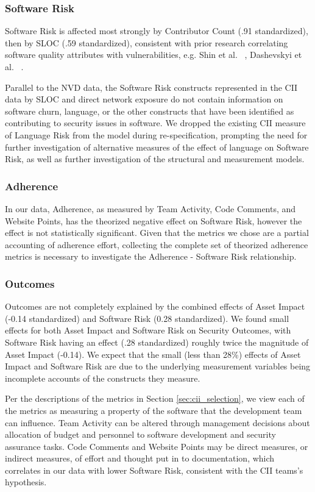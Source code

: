 \subsubsection{Software Risk}
Software Risk is affected most strongly by Contributor Count (.91 standardized), then by SLOC (.59 standardized), consistent with prior research correlating software quality attributes with vulnerabilities, e.g. Shin et al. ~\cite{shin2011evaluating}, Dashevskyi et al. ~\cite{dashevskyi2016on}.

Parallel to the NVD data, the Software Risk constructs represented in the CII data by SLOC and direct network exposure do not contain information on software churn, language, or the other constructs that have been identified as contributing to security issues in software. We dropped the existing CII measure of Language Risk from the model during re-specification, prompting the need for further investigation of alternative measures of the effect of language on Software Risk, as well as further investigation of the structural and measurement models. 

\subsubsection{Adherence} 
In our data, Adherence, as measured by Team Activity, Code Comments, and Website Points, has the theorized negative effect on Software Risk, however the effect is not statistically significant. Given that the metrics we chose are a partial accounting of adherence effort, collecting the complete set of theorized adherence metrics is necessary to investigate the Adherence - Software Risk relationship.

\subsubsection{Outcomes}
Outcomes are not completely explained by the combined effects of Asset Impact (-0.14 standardized) and Software Risk (0.28 standardized). We found small effects for both Asset Impact and Software Risk on Security Outcomes, with Software Risk having an effect (.28 standardized) roughly twice the magnitude of Asset Impact (-0.14). We expect that the small (less than 28\%) effects of Asset Impact and Software Risk are due to the underlying measurement variables being incomplete accounts of the constructs they measure.

Per the descriptions of the metrics in Section \ref{sec:cii_selection}, we view each of the metrics as measuring a property of the software that the development team can influence.
Team Activity can be altered through management decisions about allocation of budget and personnel to software development and security assurance tasks. Code Comments and Website Points may be direct measures, or indirect measures, of effort and thought put in to documentation, which correlates in our data with lower Software Risk, consistent with the CII teams's hypothesis.

